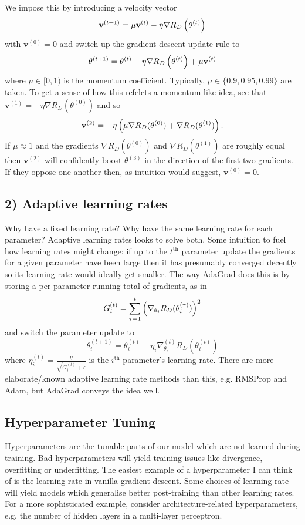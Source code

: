 \documentclass[11pt]{article}
\begin{document}
We impose this by introducing a velocity vector
$$
\mathbf{v}^{(t+1)}=\mu\mathbf{v}^{(t)}-\eta\nabla R_D\left(\theta^{(t)}\right)
$$
with $\mathbf{v}^{(0)}=0$ and switch up the gradient descent update rule to
$$
\theta^{(t+1)}
=
\theta^{(t)}-\eta\nabla R_D\left(\theta^{(t)}\right)+\mu\mathbf{v}^{(t)}
$$
where $\mu\in[0,1)$ is the momentum coefficient. Typically, $\mu\in\{0.9,0.95,0.99\}$ are taken. To get a sense of how this refelcts a momentum-like idea, see that $\mathbf{v}^{(1)}=-\eta\nabla R_D(\theta^{(0)})$ and so
$$
\mathbf{v}^{(2)}
=
-\eta\left(\mu\nabla R_D(\theta^{(0)})+\nabla R_D(\theta^{(1)})\right).
$$
If $\mu\approx1$ and the gradients $\nabla R_D(\theta^{(0)})$ and $\nabla R_D(\theta^{(1)})$ are roughly equal then $\mathbf{v}^{(2)}$ will confidently boost $\theta^{(3)}$ in the direction of the first two gradients. If they oppose one another then, as intuition would suggest, $\mathbf{v}^{(0)}=0$.

\subsection*{2) Adaptive learning rates}
Why have a fixed learning rate? Why have the same learning rate for each parameter? Adaptive learning rates looks to solve both. Some intuition to fuel how learning rates might change: if up to the $t^{\text{th}}$ parameter update the gradients for a given parameter have been large then it has presumably converged decently so its learning rate would ideally get smaller. The way AdaGrad does this is by storing a per parameter running total of gradients, as in
$$
G_i^{(t)}
=
\sum_{\tau=1}^t\left(\nabla_{\theta_i}R_D(\theta_i^{(\tau)})\right)^2
$$
and switch the parameter update to
$$
\theta_i^{(t+1)}
=
\theta_i^{(t)}-\eta_i\nabla_{\theta_i}^{(t)}R_D(\theta_i^{(t)})
$$
where $\eta_i^{(t)}=\frac{\eta}{\sqrt{G_i^{(t)}}+\epsilon}$ is the $i^{\text{th}}$ parameter's learning rate. There are more elaborate/known adaptive learning rate methods than this, e.g. RMSProp and Adam, but AdaGrad conveys the idea well.

\subsection{Hyperparameter Tuning}
Hyperparameters are the tunable parts of our model which are not learned during training. Bad hyperparameters will yield training issues like divergence, overfitting or underfitting. The easiest example of a hyperparameter I can think of is the learning rate in vanilla gradient descent. Some choices of learning rate will yield models which generalise better post-training than other learning rates. For a more sophisticated example, consider architecture-related hyperparameters, e.g. the number of hidden layers in a multi-layer perceptron.
\end{document}
